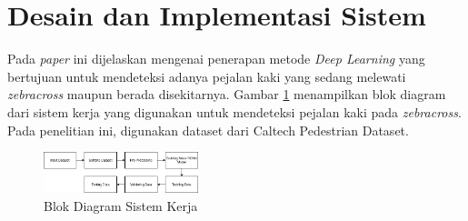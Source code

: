 \documentclass[conference]{IEEEtran}
\begin{document}
	\section{Desain dan Implementasi Sistem}
	\vspace{1ex}
	Pada \textit{paper} ini dijelaskan mengenai penerapan metode \textit{Deep Learning} yang bertujuan untuk mendeteksi adanya pejalan kaki yang sedang melewati \textit{zebracross} maupun berada disekitarnya. Gambar \ref{fig:1} menampilkan blok diagram dari sistem kerja yang digunakan untuk mendeteksi pejalan kaki pada \textit{zebracross}. Pada penelitian ini, digunakan dataset dari Caltech Pedestrian Dataset.
	\vspace{1ex}
	\begin{figure}[!ht] \centering
		\includegraphics[width=0.4\textwidth]{img/blok-diagram.png}
		\caption{Blok Diagram Sistem Kerja}
		\label{fig:1}
	\end{figure}
\end{document}

